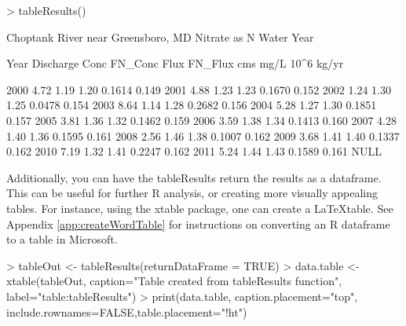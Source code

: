 \documentclass[a4paper,11pt]{article}
\begin{document}
\begin{Schunk}
\begin{Sinput}
> tableResults()
\end{Sinput}
\begin{Soutput}
   Choptank River near Greensboro, MD 
   Nitrate as N
   Water Year 

   Year   Discharge    Conc    FN_Conc     Flux    FN_Flux
             cms            mg/L             10^6 kg/yr 

   2000      4.72      1.19      1.20    0.1614     0.149
   2001      4.88      1.23      1.23    0.1670     0.152
   2002      1.24      1.30      1.25    0.0478     0.154
   2003      8.64      1.14      1.28    0.2682     0.156
   2004      5.28      1.27      1.30    0.1851     0.157
   2005      3.81      1.36      1.32    0.1462     0.159
   2006      3.59      1.38      1.34    0.1413     0.160
   2007      4.28      1.40      1.36    0.1595     0.161
   2008      2.56      1.46      1.38    0.1007     0.162
   2009      3.68      1.41      1.40    0.1337     0.162
   2010      7.19      1.32      1.41    0.2247     0.162
   2011      5.24      1.44      1.43    0.1589     0.161
NULL
\end{Soutput}
\end{Schunk}

\FloatBarrier

Additionally, you can have the tableResults return the results as a dataframe. This can be useful for further R analysis, or creating more visually appealing tables.  For instance, using the xtable package, one can create a \LaTeX table. See Appendix \ref{app:createWordTable} for instructions on converting an R dataframe to a table in Microsoft.


\begin{Schunk}
\begin{Sinput}
> tableOut <- tableResults(returnDataFrame = TRUE)
> data.table <- xtable(tableOut, 
     caption="Table created from tableResults function",
     label="table:tableResults")
> print(data.table, caption.placement="top",
       include.rownames=FALSE,table.placement="!ht")
\end{Sinput}
\end{Schunk}
\end{document}
